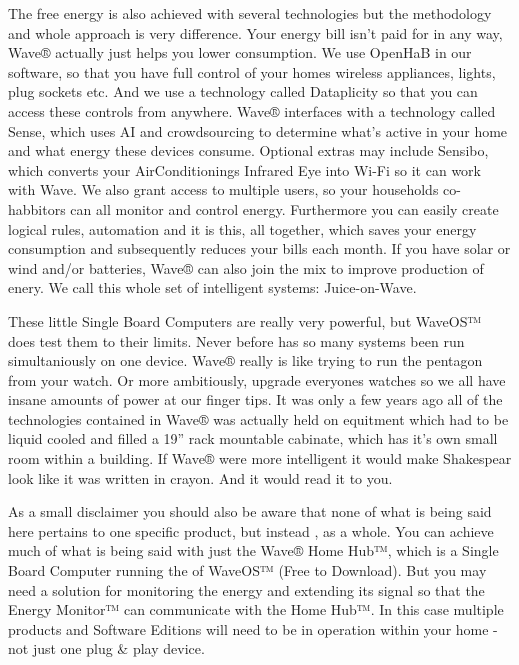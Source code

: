 \documentclass[letterpaper,10pt,english]{sphinxmanual}
\begin{document}
The free energy is also achieved with several technologies but the methodology and whole approach is very difference. Your energy bill isn’t paid for in any way, Wave® actually just helps you lower consumption. We use OpenHaB in our software, so that you have full control of your homes wireless appliances, lights, plug sockets etc. And we use a technology called Dataplicity so that you can access these controls from anywhere. Wave® interfaces with a technology called Sense, which uses AI and crowdsourcing to determine what’s active in your home and what energy these devices consume. Optional extras may include Sensibo, which converts your AirConditionings Infrared Eye into Wi-Fi so it can work with Wave. We also grant access to multiple users, so your households co-habbitors can all monitor and control energy. Furthermore you can easily create logical rules, automation and it is this, all together, which saves your energy consumption and subsequently reduces your bills each month. If you have solar or wind and/or batteries, Wave® can also join the mix to improve production of enery.  We call this whole set of intelligent systems: Juice-on-Wave.

These little Single Board Computers are really very powerful, but WaveOS™ does test them to their limits. Never before has so many systems been run simultaniously on one device. Wave® really is like trying to run the pentagon from your watch. Or more ambitiously, upgrade everyones watches so we all have insane amounts of power at our finger tips. It was only a few years ago all of the technologies contained in Wave® was actually held on equitment which had to be liquid cooled and filled a 19” rack mountable cabinate, which has it’s own small room within a building. If Wave® were more intelligent it would make Shakespear look like it was written in crayon. And it would read it to you.

As a small disclaimer you should also be aware that none of what is being said here pertains to one specific product, but instead , as a whole. You can achieve much of what is being said with just the Wave® Home Hub™, which is a Single Board Computer running the  of WaveOS™ (Free to Download). But you may need a solution for monitoring the energy and extending its signal so that the Energy Monitor™ can communicate with the Home Hub™. In this case multiple products and Software Editions will need to be in operation within your home - not just one plug \& play device.
\end{document}
